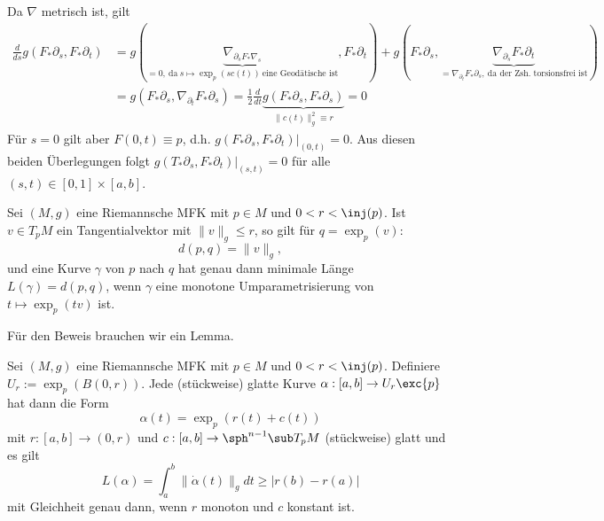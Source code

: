 \begin{beweis}
Da $\nabla$ metrisch ist, gilt 
\begin{align}
\frac{d}{ds} g(F_\ast \partial_s, F_\ast \partial_t) &= g(\underbrace{\nabla_{\partial_s F_\ast \nabla_s}}_{=0, \ \text{da} \ s \mapsto \exp_p(sc(t)) \ \text{eine Geodätische ist}}, F_\ast \partial_t)+ g(F_\ast \partial_s, \underbrace{\nabla_{\partial_s} F_\ast \partial_t}_{= \nabla_{\partial_t} F_\ast \partial_s, \ \text{da der Zsh. torsionsfrei ist}})\\
&= g(F_\ast \partial_s, \nabla_{\partial_t} F_\ast \partial_s) = \frac{1}{2} \frac{d}{dt} \underbrace{g(F_\ast \partial_s, F_\ast \partial_s)}_{\| c(t) \|^2_g \equiv r} = 0
\end{align}
Für $s=0$ gilt aber $F(0,t) \equiv p$, d.h. $g(F_\ast \partial_s, F_\ast \partial_t)|_{(0,t)} = 0$. Aus diesen beiden Überlegungen folgt $g(T_\ast \partial_s, F_\ast \partial_t)|_{(s,t)} = 0$ für alle $(s,t) \in [0,1]\times [a,b]$.
\end{beweis}
\begin{satz}{}{}
Sei $(M,g)$ eine Riemannsche MFK mit $p \in M$ und $0 < r < \inj(p)$. Ist $v \in T_pM$ ein Tangentialvektor mit $\| v \|_g \leq r$, so gilt für $q = \exp_p (v)$:
\begin{equation}
d(p,q) = \| v \|_g,
\end{equation}
und eine Kurve $\gamma$ von $p$ nach $q$ hat genau dann minimale Länge $L(\gamma) = d(p,q)$, wenn $\gamma$ eine monotone Umparametrisierung von $t \mapsto \exp_p (tv)$ ist.
\end{satz}
Für den Beweis brauchen wir ein Lemma.
\begin{lemma}{}{}
Sei $(M,g)$ eine Riemannsche MFK mit $p \in M$ und $0 < r < \inj(p)$. Definiere $U_r := \exp_p (B(0,r))$. Jede (stückweise) glatte Kurve $\alpha: [a,b] \to U_r \exc \{p \}$ hat dann die Form
\begin{equation}
\alpha(t) = \exp_p (r(t)+c(t))
\end{equation}
mit $r: [a,b] \to (0,r)$ und $c: [a,b] \to \sph^{n-1} \sub T_pM$ (stückweise) glatt und es gilt
\begin{equation}
L(\alpha) = \int_a^b \| \dot{\alpha} (t) \|_g dt \geq |r(b)-r(a)|
\end{equation}
mit Gleichheit genau dann, wenn $r$ monoton und $c$ konstant ist.
\end{lemma}
